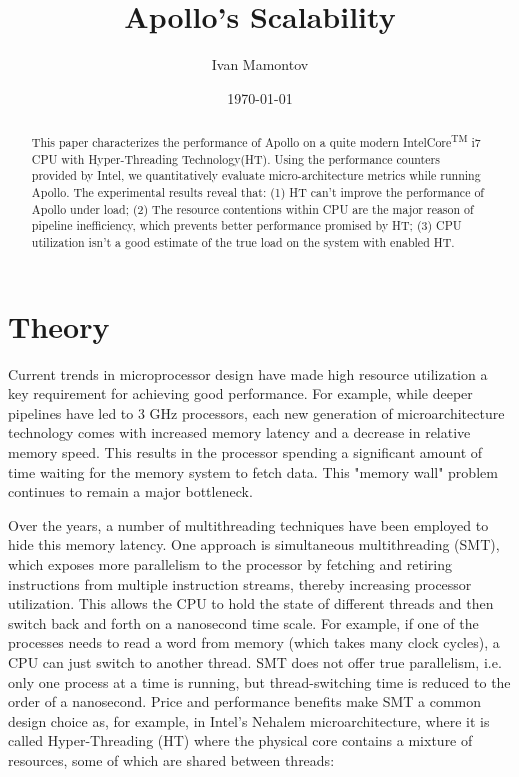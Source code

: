 \documentclass[12pt]{article}
\title{Apollo's Scalability}
\date{\today}
\author{Ivan Mamontov}
\begin{document}
\maketitle

\tableofcontents{}

\begin{abstract}

This paper characterizes the performance of Apollo on a quite modern Intel\circledR Core\textsuperscript{TM} i7 CPU with Hyper-Threading Technology(HT). Using the performance counters provided by Intel, we quantitatively evaluate micro-architecture metrics while running Apollo. The experimental results reveal that: (1) HT can't improve the performance of Apollo under load; (2) The resource contentions within CPU are the major reason of pipeline inefficiency, which prevents better performance promised by HT; (3) CPU utilization isn't a good estimate of the true load on the system with enabled HT.

\end{abstract}

\section{Theory}

Current trends in microprocessor design have made high resource utilization a key requirement for achieving good performance. For example, while deeper pipelines have led to 3 GHz processors, each new generation of microarchitecture technology comes with increased memory latency and a decrease in relative memory speed. This results in the processor spending a significant amount of time waiting for the memory system to fetch data. This "memory wall" problem continues to remain a major bottleneck\cite{impact}.

Over the years, a number of multithreading techniques have been employed to hide this memory latency. One approach is simultaneous multithreading (SMT), which exposes more parallelism to the processor by fetching and retiring instructions from multiple instruction streams, thereby increasing processor utilization. This allows the CPU to hold the state of different threads and then switch back and forth on a nanosecond time scale. For example, if one of the processes needs to read a word from memory (which takes many clock cycles), a CPU can just switch to another thread. SMT does not offer true parallelism, i.e. only one process at a time is running, but thread-switching time is reduced to the order of a nanosecond\cite{tanenbaum}. Price and performance benefits make SMT a common design choice as, for example, in Intel's Nehalem microarchitecture, where it is called Hyper-Threading (HT) where the physical core contains a mixture of resources, some of which are shared between threads\cite{intel}:
\end{document}
